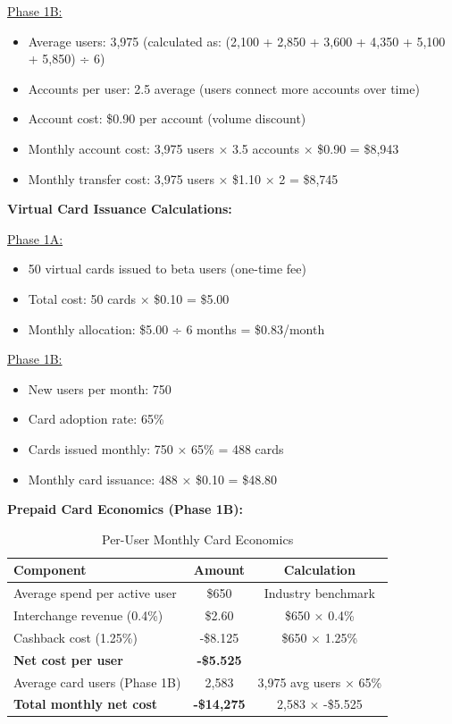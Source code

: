 \documentclass[11pt,letterpaper]{article}
\begin{document}
\underline{Phase 1B:}
\begin{itemize}
\item Average users: 3,975 (calculated as: (2,100 + 2,850 + 3,600 + 4,350 + 5,100 + 5,850) ÷ 6)
\item Accounts per user: 2.5 average (users connect more accounts over time)
\item Account cost: \$0.90 per account (volume discount)
\item Monthly account cost: 3,975 users × 3.5 accounts × \$0.90 = \$8,943
\item Monthly transfer cost: 3,975 users × \$1.10 × 2 = \$8,745
\end{itemize}

\textbf{Virtual Card Issuance Calculations:}

\underline{Phase 1A:}
\begin{itemize}
\item 50 virtual cards issued to beta users (one-time fee)
\item Total cost: 50 cards × \$0.10 = \$5.00
\item Monthly allocation: \$5.00 ÷ 6 months = \$0.83/month
\end{itemize}

\underline{Phase 1B:}
\begin{itemize}
\item New users per month: 750
\item Card adoption rate: 65\% 
\item Cards issued monthly: 750 × 65\% = 488 cards
\item Monthly card issuance: 488 × \$0.10 = \$48.80
\end{itemize}

\textbf{Prepaid Card Economics (Phase 1B):}
\begin{table}[h]
\centering
\caption{Per-User Monthly Card Economics}
\begin{tabular}{|l|c|c|}
\hline
\textbf{Component} & \textbf{Amount} & \textbf{Calculation} \\
\hline
Average spend per active user & \$650 & Industry benchmark \\
Interchange revenue (0.4\%) & \$2.60 & \$650 × 0.4\% \\
Cashback cost (1.25\%) & -\$8.125 & \$650 × 1.25\% \\
\textbf{Net cost per user} & \textbf{-\$5.525} & \\
\hline
Average card users (Phase 1B) & 2,583 & 3,975 avg users × 65\% \\
\textbf{Total monthly net cost} & \textbf{-\$14,275} & 2,583 × -\$5.525 \\
\hline
\end{tabular}
\end{table}
\end{document}
